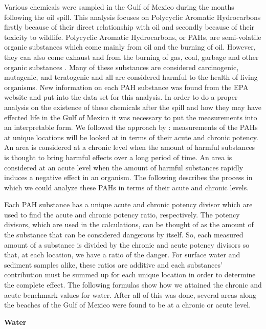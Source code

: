 \documentclass[authoryear,12pt]{elsarticle}
\begin{document}
Various chemicals were sampled in the Gulf of Mexico during the months following the oil spill. This analysis focuses on Polycyclic Aromatic Hydrocarbons firstly because of their direct relationship with oil and secondly because of their toxicity to wildlife. Polycyclic Aromatic Hydrocarbons, or PAHs, are semi-volatile organic substances which come mainly from oil and the burning of oil. However, they can also come exhaust and from the burning of gas, coal, garbage and other organic substances \citep{pah}.   Many of these substances are considered carcinogenic, mutagenic, and teratogenic and all are considered harmful to the health of living organisms. New information on each PAH substance was found from the EPA website  \citep{pah} and put into the data set for this analysis. In order to do a proper analysis on the existence of these chemicals after the spill and how they may have effected life in the Gulf of Mexico it was necessary to put the measurements into an interpretable form. We followed the approach by \citet{pah-benchmark}: measurements of the PAHs at unique locations will be looked at in terms of their acute and chronic potency. An area is considered at a chronic level when the amount of harmful substances is thought to bring harmful effects over a long period of time. An area is considered at an acute level when the amount of harmful substances rapidly induces a negative effect in an organism. The following describes the process in which we could analyze these PAHs in terms of their acute and chronic levels. 


Each PAH substance has a unique acute and chronic potency divisor which are used to find the acute and chronic potency ratio, respectively. The potency divisors, which are used in the calculations, can be thought of as the amount of the substance that can be considered dangerous by itself. So, each measured amount of a substance is divided by the chronic and acute potency divisors so that, at each location, we have a ratio of the danger. For surface water and sediment samples alike, these ratios are additive and each substances' contribution must be summed up for each unique location in order to determine the complete effect. The following formulas show how we attained the chronic and acute benchmark values for water. After all of this was done, several areas along the beaches of the Gulf of Mexico were found to be at a chronic or acute level. 
\begin{center} \textbf{Water} \end{center}
\end{document}
